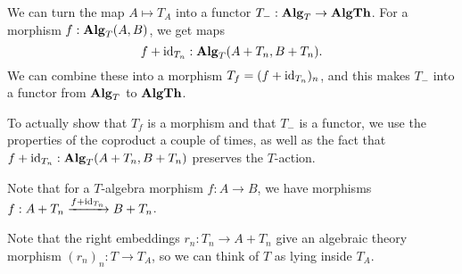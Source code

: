 \begin{remark}
  We can turn the map $ A \mapsto T_A $ into a functor $ T_- : \mathbf{Alg}_{T} \to \mathbf{AlgTh} $. For a morphism $ f: \mathbf{Alg}_{T}(A, B) $, we get maps
  \[ f + \text{id}_{T_n} : \mathbf{Alg}_{T}(A + T_n, B + T_n). \]
  We can combine these into a morphism $ T_f = (f + \text{id}_{T_n})_n $, and this makes $ T_- $ into a functor from $ \mathbf{Alg}_{T} $ to $ \mathbf{AlgTh} $.

  To actually show that $ T_f $ is a morphism and that $ T_- $ is a functor, we use the properties of the coproduct a couple of times, as well as the fact that $ f + \text{id}_{T_n} : \mathbf{Alg}_{T}(A + T_n, B + T_n) $ preserves the $ T $-action.
\end{remark}

\begin{remark}
  Note that for a $ T $-algebra morphism $ f: A \to B $, we have morphisms $ f: A + T_n \xrightarrow{f + \text{id}_{T_n}} B + T_n $.
\end{remark}

\begin{remark}
  Note that the right embeddings $ r_n : T_n \to A + T_n $ give an algebraic theory morphism $ (r_n)_n : T \to T_A $, so we can think of $ T $ as lying inside $ T_A $.
\end{remark}

